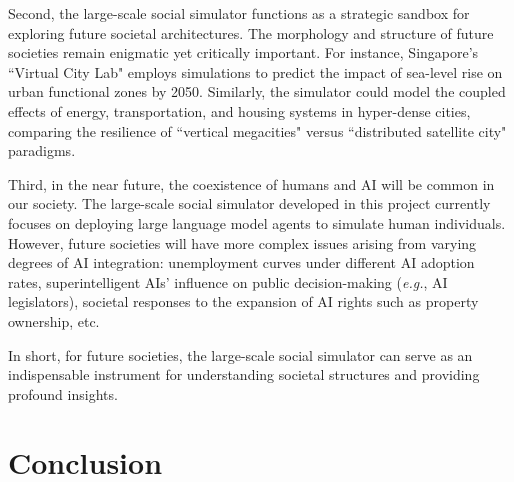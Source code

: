Second, the large-scale social simulator functions as a strategic sandbox for exploring future societal architectures. The morphology and structure of future societies remain enigmatic yet critically important. For instance, Singapore’s ``Virtual City Lab" employs simulations to predict the impact of sea-level rise on urban functional zones by 2050. Similarly, the simulator could model the coupled effects of energy, transportation, and housing systems in hyper-dense cities, comparing the resilience of ``vertical megacities" versus ``distributed satellite city" paradigms.

Third, in the near future, the coexistence of humans and AI will be common in our society. The large-scale social simulator developed in this project currently focuses on deploying large language model agents to simulate human individuals. However, future societies will have more complex issues arising from varying degrees of AI integration: unemployment curves under different AI adoption rates, superintelligent AIs' influence on public decision-making (\textit{e.g.}, AI legislators), societal responses to the expansion of AI rights such as property ownership, etc.

In short, for future societies, the large-scale social simulator can serve as an indispensable instrument for understanding societal structures and providing profound insights.

\section{Conclusion}


